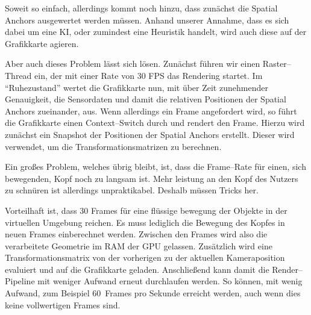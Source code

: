     Soweit so einfach, allerdings kommt noch hinzu, dass zunächst die Spatial Anchors ausgewertet werden müssen.
    Anhand unserer Annahme, dass es sich dabei um eine KI, oder zumindest eine Heuristik handelt, wird auch diese auf der Grafikkarte agieren.

    Aber auch dieses Problem lässt sich lösen.
    Zunächst führen wir einen Raster--Thread ein, der mit einer Rate von 30 FPS das Rendering startet.
    Im \enquote{Ruhezustand} wertet die Grafikkarte nun, mit über Zeit zunehmender Genauigkeit, die Sensordaten und damit die relativen Positionen der Spatial Anchors zueinander, aus.
    Wenn allerdings ein Frame angefordert wird, so führt die Grafikkarte einen Context--Switch durch und rendert den Frame.
    Hierzu wird zunächst ein Snapshot der Positionen der Spatial Anchors erstellt.
    Dieser wird verwendet, um die Transformationsmatrizen zu berechnen.

    Ein großes Problem, welches übrig bleibt, ist, dass die Frame--Rate für einen, sich bewegenden, Kopf noch zu langsam ist.
    Mehr leistung an den Kopf des Nutzers zu schnüren ist allerdings unpraktikabel.
    Deshalb müssen Tricks her.

    Vorteilhaft ist, dass 30 Frames für eine flüssige bewegung der Objekte in der virtuellen Umgebung reichen.
    Es muss lediglich die Bewegung des Kopfes in neuen Frames einberechnet werden.
    Zwischen den Frames wird also die verarbeitete Geometrie im RAM der GPU gelassen.
    Zusätzlich wird eine Transformationsmatrix von der vorherigen zu der aktuellen Kameraposition evaluiert und auf die Grafikkarte geladen.
    Anschließend kann damit die Render--Pipeline mit weniger Aufwand erneut durchlaufen werden.
    So können, mit wenig Aufwand, zum Beispiel 60~Frames pro Sekunde erreicht werden, auch wenn dies keine vollwertigen Frames sind.


